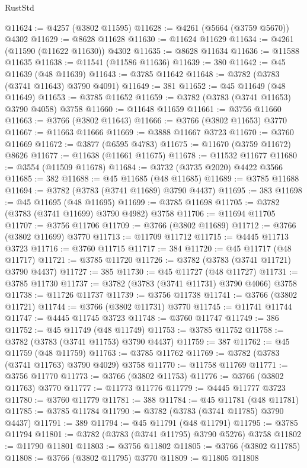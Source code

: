 \begin{lexlean}{RustStd}
\begin{coremodule}
@11624 := @4257 (@3802 @11595)
@11628 := @4261 (@5664 (@3759 @5670)) @4302
@11629 := @8628 @11628
@11630 := @11624 @11629
@11634 := @4261 (@11590 (@11622 @11630)) @4302
@11635 := @8628 @11634
@11636 := @11588 @11635
@11638 := @11541 (@11586 @11636)
@11639 := 380
@11642 := @45 @11639 (@48 @11639)
@11643 := @3785 @11642
@11648 := @3782 (@3783 (@3741 @11643) @3790 @4091)
@11649 := 381
@11652 := @45 @11649 (@48 @11649)
@11653 := @3785 @11652
@11659 := @3782 (@3783 (@3741 @11653) @3790 @4058) @3758
@11660 := @11648 @11659
@11661 := @3756 @11660
@11663 := @3766 (@3802 @11643)
@11666 := @3766 (@3802 @11653) @3770
@11667 := @11663 @11666
@11669 := @3888 @11667 @3723
@11670 := @3760 @11669
@11672 := @3877 (@6595 @4783)
@11675 := @11670 (@3759 @11672) @8626
@11677 := @11638 (@11661 @11675)
@11678 := @11532 @11677
@11680 := @3554 (@11509 @11678)
@11684 := @3732 (@3735 @2020) @4422 @3566
@11685 := 382
@11688 := @45 @11685 (@48 @11685)
@11689 := @3785 @11688
@11694 := @3782 (@3783 (@3741 @11689) @3790 @4437)
@11695 := 383
@11698 := @45 @11695 (@48 @11695)
@11699 := @3785 @11698
@11705 := @3782 (@3783 (@3741 @11699) @3790 @4982) @3758
@11706 := @11694 @11705
@11707 := @3756 @11706
@11709 := @3766 (@3802 @11689)
@11712 := @3766 (@3802 @11699) @3770
@11713 := @11709 @11712
@11715 := @4445 @11713 @3723
@11716 := @3760 @11715
@11717 := 384
@11720 := @45 @11717 (@48 @11717)
@11721 := @3785 @11720
@11726 := @3782 (@3783 (@3741 @11721) @3790 @4437)
@11727 := 385
@11730 := @45 @11727 (@48 @11727)
@11731 := @3785 @11730
@11737 := @3782 (@3783 (@3741 @11731) @3790 @4066) @3758
@11738 := @11726 @11737
@11739 := @3756 @11738
@11741 := @3766 (@3802 @11721)
@11744 := @3766 (@3802 @11731) @3770
@11745 := @11741 @11744
@11747 := @4445 @11745 @3723
@11748 := @3760 @11747
@11749 := 386
@11752 := @45 @11749 (@48 @11749)
@11753 := @3785 @11752
@11758 := @3782 (@3783 (@3741 @11753) @3790 @4437)
@11759 := 387
@11762 := @45 @11759 (@48 @11759)
@11763 := @3785 @11762
@11769 := @3782 (@3783 (@3741 @11763) @3790 @4029) @3758
@11770 := @11758 @11769
@11771 := @3756 @11770
@11773 := @3766 (@3802 @11753)
@11776 := @3766 (@3802 @11763) @3770
@11777 := @11773 @11776
@11779 := @4445 @11777 @3723
@11780 := @3760 @11779
@11781 := 388
@11784 := @45 @11781 (@48 @11781)
@11785 := @3785 @11784
@11790 := @3782 (@3783 (@3741 @11785) @3790 @4437)
@11791 := 389
@11794 := @45 @11791 (@48 @11791)
@11795 := @3785 @11794
@11801 := @3782 (@3783 (@3741 @11795) @3790 @5276) @3758
@11802 := @11790 @11801
@11803 := @3756 @11802
@11805 := @3766 (@3802 @11785)
@11808 := @3766 (@3802 @11795) @3770
@11809 := @11805 @11808

\end{coremodule}
\end{lexlean}
